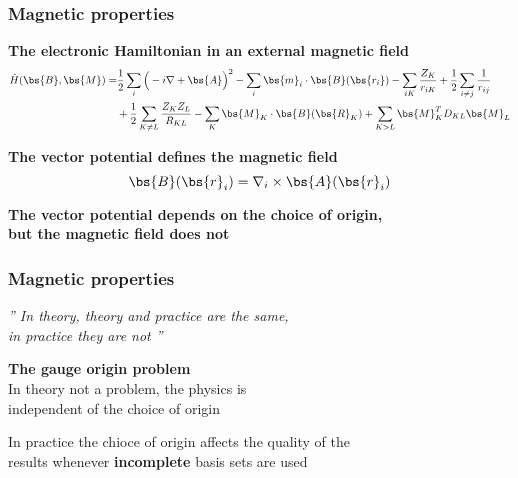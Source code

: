 \begin{frame}
    \frametitle{Magnetic properties}
    \centering
    \textbf{The electronic Hamiltonian in an external magnetic field}
    \begin{align}
        \nonumber
        \hat{H}(\bs{B},\bs{M}) =& \frac{1}{2}\sum_i\Big(-i\nabla + \bs{A}\Big)^2
        -\sum_i\bs{m}_i\cdot\bs{B}(\bs{r_i}) - \sum_{iK}\frac{Z_K}{r_{iK}}
        +\frac{1}{2}\sum_{i \neq j}\frac{1}{r_{ij}}\\
        \nonumber
        & + \frac{1}{2}\sum_{K \neq L}
        \frac{Z_K Z_L}{R_{KL}} - \sum_K\bs{M}_K\cdot\bs{B}(\bs{R}_K) +
        \sum_{K>L}\bs{M}_K^TD_{KL}\bs{M}_L
    \end{align}

    \vspace{10mm}

    \textbf{The vector potential defines the magnetic field}
    \begin{equation}
        \nonumber
        \bs{B}(\bs{r}_i) = \nabla_i \times \bs{A}(\bs{r}_i)
    \end{equation}

    \vspace{10mm}

    \textbf{The vector potential depends on the choice of origin,\\
    but the magnetic field does not}
\end{frame}

\begin{frame}
    \frametitle{Magnetic properties}
    \begin{exampleblock}{{
        \begin{center}
        \it{''
        In theory, theory and practice are the same,\\
        in practice they are not
        ''}
        \end{center}
        }}
	\vskip2mm
	\hspace*{}
    \end{exampleblock}

    \pause
    \vspace{10mm}

    \centering
    \textbf{The gauge origin problem}\\
    In theory not a problem, the physics is\\
    independent of the choice of origin\\

    \vspace{5mm}

    In practice the chioce of origin affects the quality of the\\
    results whenever \textbf{incomplete} basis sets are used
\end{frame}

